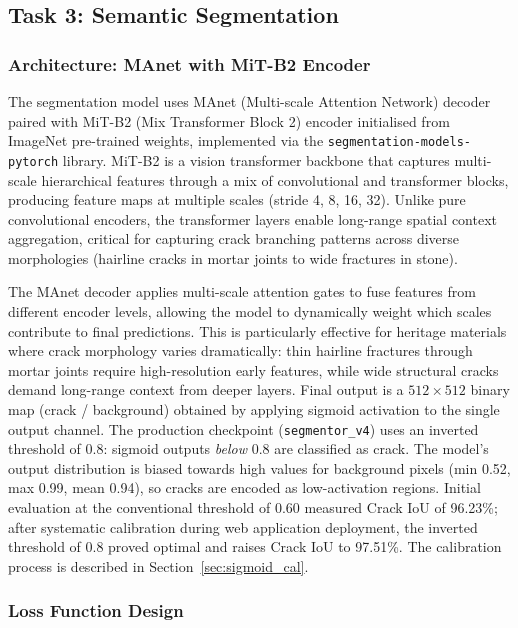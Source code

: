 \documentclass[12pt,a4paper]{article}
\begin{document}
\subsection{Task 3: Semantic Segmentation}
\label{sec:seg_methods}

\subsubsection{Architecture: MAnet with MiT-B2 Encoder}

The segmentation model uses MAnet (Multi-scale Attention Network) decoder paired with MiT-B2 (Mix Transformer Block 2) encoder initialised from ImageNet pre-trained weights, implemented via the \texttt{segmentation-models-pytorch} library. MiT-B2 is a vision transformer backbone that captures multi-scale hierarchical features through a mix of convolutional and transformer blocks, producing feature maps at multiple scales (stride 4, 8, 16, 32). Unlike pure convolutional encoders, the transformer layers enable long-range spatial context aggregation, critical for capturing crack branching patterns across diverse morphologies (hairline cracks in mortar joints to wide fractures in stone).

The MAnet decoder applies multi-scale attention gates to fuse features from different encoder levels, allowing the model to dynamically weight which scales contribute to final predictions. This is particularly effective for heritage materials where crack morphology varies dramatically: thin hairline fractures through mortar joints require high-resolution early features, while wide structural cracks demand long-range context from deeper layers. Final output is a $512 \times 512$ binary map (crack / background) obtained by applying sigmoid activation to the single output channel. The production checkpoint (\texttt{segmentor\_v4}) uses an inverted threshold of 0.8: sigmoid outputs \textit{below} 0.8 are classified as crack. The model's output distribution is biased towards high values for background pixels (min 0.52, max 0.99, mean 0.94), so cracks are encoded as low-activation regions. Initial evaluation at the conventional threshold of 0.60 measured Crack IoU of 96.23\%; after systematic calibration during web application deployment, the inverted threshold of 0.8 proved optimal and raises Crack IoU to 97.51\%. The calibration process is described in Section~\ref{sec:sigmoid_cal}.

\subsubsection{Loss Function Design}
\end{document}
